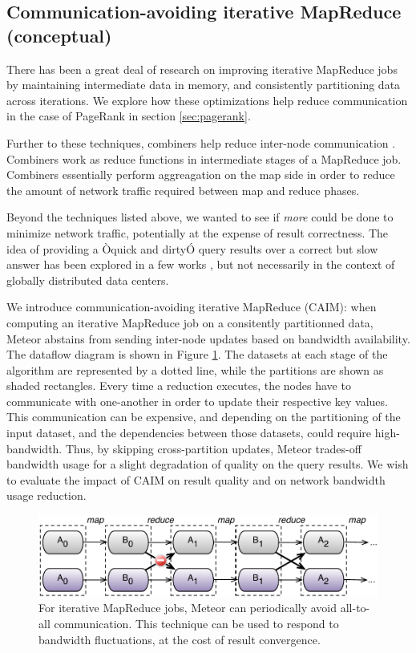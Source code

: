 \subsection{Communication-avoiding iterative MapReduce (conceptual)}

There has been a great deal of research on improving iterative MapReduce jobs \cite{haloop, twister, rdd} by maintaining intermediate data in memory, and consistently partitioning data across iterations. We explore how these optimizations help reduce communication in the case of PageRank in section \ref{sec:pagerank}.

Further to these techniques, combiners help reduce inter-node communication \cite{hop}. Combiners work as reduce functions in intermediate stages of a MapReduce job. Combiners essentially perform aggreagation on the map side in order to reduce the amount of network traffic required between map and reduce phases.

Beyond the techniques listed above, we wanted to see if \emph{more} could be done to minimize network traffic, potentially at the expense of result correctness. The idea of providing a Òquick and dirtyÓ query results over a correct but slow answer has been explored in a few works \cite{blinkdb, hop}, but not necessarily in the context of globally distributed data centers.

We introduce communication-avoiding iterative MapReduce (CAIM): when computing an iterative MapReduce job on a consitently partitionned data, Meteor abstains from sending inter-node updates based on bandwidth availability. The dataflow diagram is shown in Figure \ref{fig:comm-avoiding}. The datasets at each stage of the algorithm are represented by a dotted line, while the partitions are shown as shaded rectangles. Every time a reduction executes, the nodes have to communicate with one-another in order to update their respective key values. This communication can be expensive, and depending on the partitioning of the input dataset, and the dependencies between those datasets, could require high-bandwidth. Thus, by skipping cross-partition updates, Meteor trades-off bandwidth usage for a slight degradation of quality on the query results. We wish to evaluate the impact of CAIM on result quality and on network bandwidth usage reduction.

\begin{figure}[!ht]
\centering\includegraphics[width=0.9\columnwidth]{figs/comm_avoiding.pdf}
\caption{For iterative MapReduce jobs, Meteor can periodically avoid all-to-all communication. This technique can be used to respond to bandwidth fluctuations, at the cost of result convergence.}
\label{fig:comm-avoiding}
\vspace{.7em}
\end{figure}

